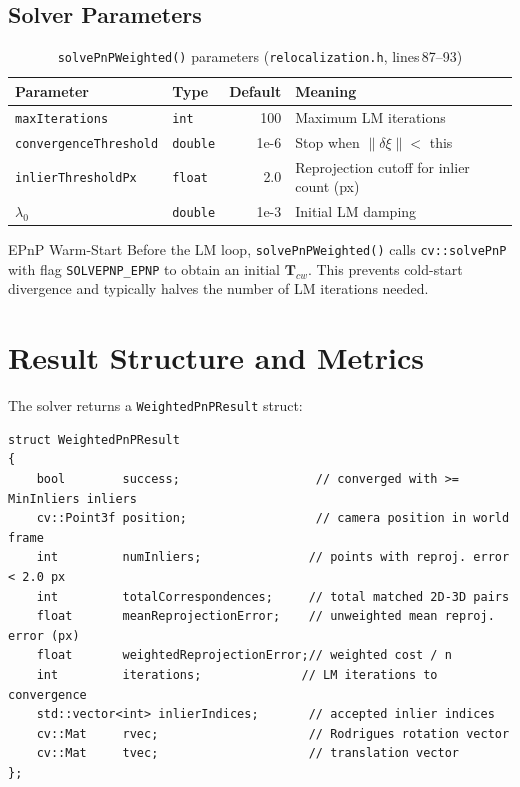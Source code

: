 \documentclass[12pt,a4paper]{article}
\begin{document}
\subsection{Solver Parameters}

\begin{table}[H]
\centering
\caption{\texttt{solvePnPWeighted()} parameters
         (\texttt{relocalization.h}, lines\,87--93)}
\begin{tabular}{llrl}
\toprule
Parameter & Type & Default & Meaning \\
\midrule
\texttt{maxIterations}        & \texttt{int}    & 100   & Maximum LM iterations \\
\texttt{convergenceThreshold} & \texttt{double} & 1e-6  & Stop when $\|\delta\xi\| <$ this \\
\texttt{inlierThresholdPx}    & \texttt{float}  & 2.0   & Reprojection cutoff for inlier count (px) \\
$\lambda_0$                   & \texttt{double} & 1e-3  & Initial LM damping \\
\bottomrule
\end{tabular}
\end{table}

\begin{definitionbox}{EPnP Warm-Start}
Before the LM loop, \texttt{solvePnPWeighted()} calls \texttt{cv::solvePnP} with flag
\texttt{SOLVEPNP\_EPNP} to obtain an initial $\mathbf{T}_{cw}$. This prevents
cold-start divergence and typically halves the number of LM iterations needed.
\end{definitionbox}

\section{Result Structure and Metrics}

The solver returns a \texttt{WeightedPnPResult} struct:

\begin{lstlisting}[style=cpp,
  caption={\texttt{WeightedPnPResult} ---
           \texttt{relocalization.h}, lines\,29--41}]
struct WeightedPnPResult
{
    bool        success;                   // converged with >= MinInliers inliers
    cv::Point3f position;                  // camera position in world frame
    int         numInliers;               // points with reproj. error < 2.0 px
    int         totalCorrespondences;     // total matched 2D-3D pairs
    float       meanReprojectionError;    // unweighted mean reproj. error (px)
    float       weightedReprojectionError;// weighted cost / n
    int         iterations;              // LM iterations to convergence
    std::vector<int> inlierIndices;       // accepted inlier indices
    cv::Mat     rvec;                     // Rodrigues rotation vector
    cv::Mat     tvec;                     // translation vector
};
\end{lstlisting}
\end{document}
